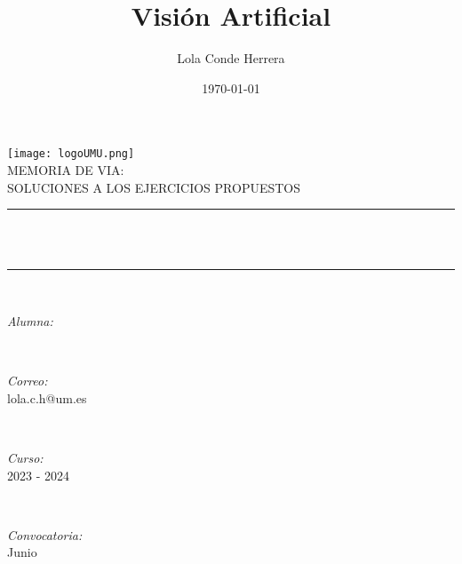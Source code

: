 \documentclass[12pt]{article}
\title{Visión Artificial}					%
\author{Lola Conde Herrera}					%
\date{\today}						%
\makeatletter
\let\thetitle\@title
\let\theauthor\@author
\makeatother
\begin{document}

\begin{titlepage}
	\centering
    \vspace*{0.0 cm}
    \texttt{[image: logoUMU.png]}\\[1.0 cm]	%
    \textsc{MEMORIA DE VIA:\\ SOLUCIONES A LOS EJERCICIOS PROPUESTOS}\\[1.0 cm]	%
	\rule{\linewidth}{0.2 mm} \\[0.4 cm]
	{ \huge \bfseries \thetitle}\\
	\rule{\linewidth}{0.2 mm} \\[1.5 cm]

    \begin{minipage}{0.4\textwidth}
		\begin{center} \large
			\emph{Alumna:}\\
			\theauthor\linebreak
			\end{center}
	\end{minipage}\\[0.75 cm]

     \begin{minipage}{0.4\textwidth}
		\begin{center} \large
			\emph{Correo:}\\
			lola.c.h@um.es\linebreak
			\end{center}
	\end{minipage}\\[0.75 cm]

    \begin{minipage}{0.4\textwidth}
		\begin{center} \large
			\emph{Curso:}\\
			2023 - 2024\linebreak
			\end{center}
	\end{minipage}\\[0.75 cm]

    \begin{minipage}{0.4\textwidth}
		\begin{center} \large
			\emph{Convocatoria:}\\
			Junio\linebreak
			\end{center}
	\end{minipage}\\
 
	\vfill
	
\end{titlepage}
\end{document}
